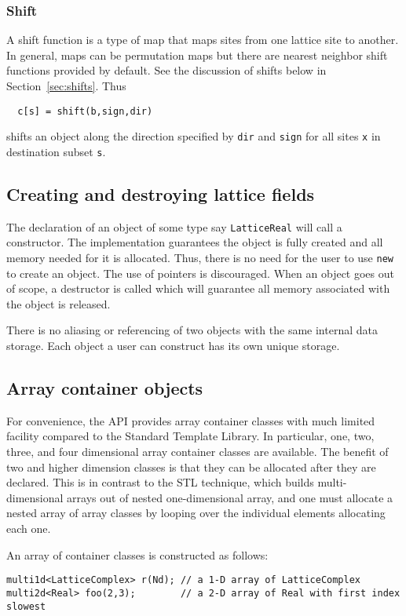 \documentclass[12pt,letterpaper]{article}
\begin{document}
\subsubsection{Shift}

A shift function is a type of map that maps sites from one lattice
site to another. In general, maps can be permutation maps but there
are nearest neighbor shift functions provided by default.
See the discussion of shifts below
in Section~\ref{sec:shifts}.
Thus
%
\begin{verbatim}
  c[s] = shift(b,sign,dir)
\end{verbatim}
%
shifts an object along the direction specified by {\tt dir} and 
{\tt sign} for all sites {\tt x} in destination subset {\tt s}.


\subsection{Creating and destroying lattice fields}

The declaration of an object of some type say {\tt LatticeReal} will
call a constructor. The implementation guarantees the object is fully
created and all memory needed for it is allocated.  Thus, there is no
need for the user to use {\tt new} to create an object. The use of
pointers is discouraged.  When an object goes out of scope, a
destructor is called which will guarantee all memory associated with
the object is released.  

There is no aliasing or referencing of two objects with the same
internal data storage. Each object a user can construct has its own
unique storage.

\subsection{Array container objects}
\label{sec:arrays}

For convenience, the API provides array container classes with much
limited facility compared to the Standard Template Library. In
particular, one, two, three, and four dimensional array container
classes are available. The benefit of two and higher dimension classes
is that they can be allocated after they are declared. This is in
contrast to the STL technique, which builds multi-dimensional arrays
out of nested one-dimensional array, and one must allocate a nested
array of array classes by looping over the individual elements
allocating each one.

An array of container classes is constructed as follows:
%
\begin{verbatim}
multi1d<LatticeComplex> r(Nd); // a 1-D array of LatticeComplex
multi2d<Real> foo(2,3);        // a 2-D array of Real with first index slowest
\end{verbatim}
\end{document}
